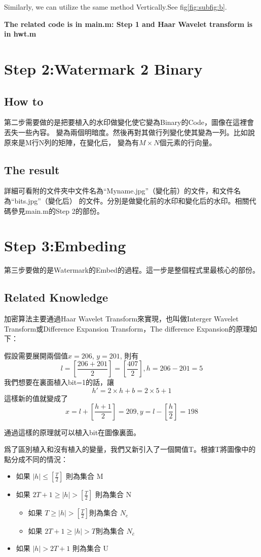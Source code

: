 \documentclass[a4paper,12pt]{article}%
\begin{document}
Similarly, we can utilize the same method Vertically.See fig\eqref{fig:subfig:b}.

\textbf{The related code is in main.m: Step 1 and Haar Wavelet transform is in hwt.m}

\section{Step 2:Watermark 2 Binary}
\subsection{How to}
    第二步需要做的是把要植入的水印做變化使它變為Binary的Code，圖像在這裡會丟失一些內容。
變為兩個明暗度。然後再對其做行列變化使其變為一列。比如說原來是M行N列的矩陣，在變化后，
變為有$M\times N$個元素的行向量。
\subsection{The result}
    詳細可看附的文件夾中文件名為“Myname.jpg”（變化前）的文件，和文件名為“bits.jpg”（變化后）
的文件。分別是做變化前的水印和變化后的水印。相關代碼參見main.m的Step 2的部份。

\section{Step 3:Embeding}
第三步要做的是Watermark的Embed的過程。這一步是整個程式里最核心的部份。

\subsection{Related Knowledge}
加密算法主要通過Haar Wavelet Transform來實現，也叫做Interger Wavelet Transform或Difference Expansion Transform，The difference Expansion的原理如下：

假設需要展開兩個值$x = 206$, $y = 201$, 則有
$$
l = [\frac{206+201}{2}]=[\frac{407}{2}],h = 206 - 201 = 5
$$
我們想要在裏面植入bit=1的話，讓
$$h' = 2 \times h + b = 2 \times 5 + 1$$
這樣新的值就變成了
$$x = l + [\frac{h+1}{2}] = 209, y = l - [\frac{h}{2}]=198$$

通過這樣的原理就可以植入bit在圖像裏面。

爲了區別植入和沒有植入的變量，我們又新引入了一個闕值T。根據T將圖像中的點分成不同的情況：

\begin{itemize}
  \item 如果 $|h| \leq [\frac{T}{2}]$ 則為集合 M
  \item 如果 $ 2T + 1 \geq |h| > [\frac{T}{2}] $ 則為集合 N
  \begin{itemize}
    \item 如果 $ T \geq |h| > [\frac{T}{2}] $則為集合 $N_e$
    \item 如果 $ 2T + 1 \geq |h| > T  $則為集合 $N_{\bar{e}}$
  \end{itemize}
  \item 如果 $|h| > 2T + 1$ 則為集合 U
\end{itemize}
\end{document}
